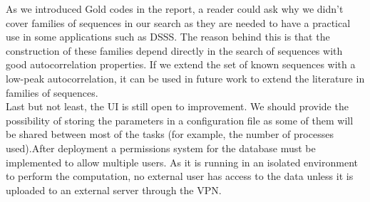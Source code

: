 \documentclass{tfg_domingo}
\begin{document}
As we introduced Gold codes in the report, a reader could ask why we didn't
cover families of sequences in our search as they are needed to have a practical
use in  some applications such as DSSS. The reason behind this is that the
construction of these families depend directly in the search of sequences with
good autocorrelation properties. If we extend the set of known sequences with
a low-peak autocorrelation, it can be used in future work to extend the
literature in families of sequences.\\

  Last but not least, the UI is still open to improvement. We should provide the
  possibility of storing the parameters in a configuration file as some of
  them will be shared between most of the tasks (for example, the number of
  processes used).After deployment a  permissions system for the database must
  be implemented to allow multiple users. As it is  running in an isolated
  environment to perform the computation, no external user has access to the
  data unless it is uploaded to an external server through the VPN.\\







\backmatter


\end{document}
